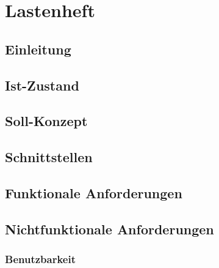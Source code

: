 \documentclass[a4paper,12pt]{article}
\title{\projektName}
\author{\authorName}
\date{\today}
\begin{document}
    
    \setcounter{page}{2}
    \setcounter{tocdepth}{4}
    \setcounter{secnumdepth}{4}
    \tableofcontents
    \clearpage
 
	\begin{abstract}
		Abstrakte Beschreibung \ldots
	\end{abstract}	
	\clearpage
    
    \printglossaries
	\clearpage
 
	\section{Lastenheft}
 	
		\subsection{Einleitung} %
 		
 		
		\subsection{Ist-Zustand} %
 		
 		
		\subsection{Soll-Konzept} %
 		
 		
		\subsection{Schnittstellen}
 		
 		
		\subsection{Funktionale Anforderungen}
 		
 		
		\subsection{Nichtfunktionale Anforderungen}
            \subsubsection{Benutzbarkeit}
            
            
\end{document}
